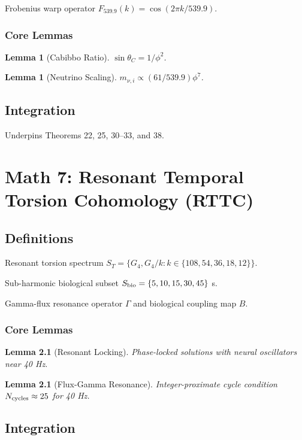 \documentclass[11pt,a4paper]{book}
\newtheorem{lemma}[theorem]{Lemma}
\theoremstyle{remark}
\theoremstyle{definition}
\begin{document}
Frobenius warp operator \(F_{539.9}(k) = \cos(2\pi k / 539.9)\).

\subsection{Core Lemmas}

\begin{lemma}[Cabibbo Ratio]
\(\sin \theta_C = 1 / \phi^2\).
\end{lemma}

\begin{lemma}[Neutrino Scaling]
\(m_{\nu,i} \propto (61 / 539.9) \phi^7\).
\end{lemma}

\section{Integration}

Underpins Theorems 22, 25, 30–33, and 38.

\chapter{Math 7: Resonant Temporal Torsion Cohomology (RTTC)}

\section{Definitions}

Resonant torsion spectrum \(S_T = \{G_4, G_4/k : k \in \{108,54,36,18,12\}\}\).

Sub-harmonic biological subset \(S_{\rm bio} = \{5,10,15,30,45\}\) s.

Gamma-flux resonance operator \(\Gamma\) and biological coupling map \(B\).

\subsection{Core Lemmas}

\begin{lemma}[Resonant Locking]
Phase-locked solutions with neural oscillators near 40 Hz.
\end{lemma}

\begin{lemma}[Flux-Gamma Resonance]
Integer-proximate cycle condition \(N_{\rm cycles} \approx 25\) for 40 Hz.
\end{lemma}

\section{Integration}
\end{document}
